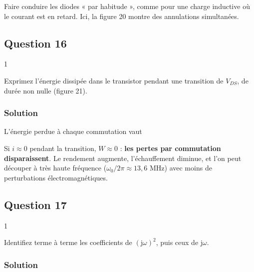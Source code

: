 \documentclass[11pt,a4paper]{article}
\newcommand{\equationajustee}[1]{%
  \sbox{\boiteequation}{$\displaystyle #1$}%
  \ifdim\wd\boiteequation>\linewidth
    \[\resizebox{\linewidth}{!}{\usebox{\boiteequation}}\]%
  \else
    \[#1\]%
  \fi}
\begin{document}
\begin{piege}

Faire conduire les diodes « par habitude », comme pour une charge inductive où le courant est en retard. Ici, la figure 20 montre des annulations simultanées.

\end{piege}

\hypertarget{question-16}{%
\subsection{Question 16}\label{question-16}}

\begin{indication}{1}

Exprimez l'énergie dissipée dans le transistor pendant une transition de \(V_{DS}\), de durée non nulle (figure 21).

\end{indication}

\hypertarget{solution-15}{%
\subsubsection{Solution}\label{solution-15}}

L'énergie perdue à chaque commutation vaut

\equationajustee{W=\int v_{DS}\,i\,\mathrm dt}

Si \(i\approx0\) pendant la transition, \(W\approx0\) : \textbf{les pertes par commutation disparaissent}. Le rendement augmente, l'échauffement diminue, et l'on peut découper à très haute fréquence (\(\omega_0/2\pi\approx13{,}6\) MHz) avec moins de perturbations électromagnétiques.

\hypertarget{question-17}{%
\subsection{Question 17}\label{question-17}}

\begin{indication}{1}

Identifiez terme à terme les coefficients de \((\mathrm j\omega)^2\), puis ceux de \(\mathrm j\omega\).

\end{indication}

\hypertarget{solution-16}{%
\subsubsection{Solution}\label{solution-16}}
\end{document}
